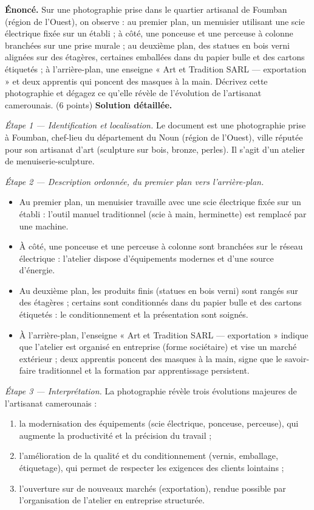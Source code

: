 \documentclass[11pt]{article}
\newcommand{\cle}[1]{{\popxbold\color{popdark}#1}}
\begin{document}
\begin{exoresolu}
\textbf{Énoncé.} Sur une photographie prise dans le quartier artisanal de Foumban (région de l'Ouest), on observe : au premier plan, un menuisier utilisant une scie électrique fixée sur un établi ; à côté, une ponceuse et une perceuse à colonne branchées sur une prise murale ; au deuxième plan, des statues en bois verni alignées sur des étagères, certaines emballées dans du papier bulle et des cartons étiquetés ; à l'arrière-plan, une enseigne « Art et Tradition SARL — exportation » et deux apprentis qui poncent des masques à la main.
Décrivez cette photographie et dégagez ce qu'elle révèle de l'évolution de l'artisanat camerounais. (6 points)
\tcblower
\textbf{Solution détaillée.}

\emph{Étape 1 — Identification et localisation.} Le document est une photographie prise à Foumban, chef-lieu du département du Noun (région de l'Ouest), ville réputée pour son artisanat d'art (sculpture sur bois, bronze, perles). Il s'agit d'un atelier de menuiserie-sculpture.

\emph{Étape 2 — Description ordonnée, du premier plan vers l'arrière-plan.}
\begin{itemize}
\item Au premier plan, un menuisier travaille avec une \cle{scie électrique} fixée sur un établi : l'outil manuel traditionnel (scie à main, herminette) est remplacé par une machine.
\item À côté, une \cle{ponceuse} et une \cle{perceuse} à colonne sont branchées sur le réseau électrique : l'atelier dispose d'équipements modernes et d'une source d'énergie.
\item Au deuxième plan, les produits finis (statues en bois verni) sont rangés sur des étagères ; certains sont \cle{conditionnés} dans du papier bulle et des cartons étiquetés : le conditionnement et la présentation sont soignés.
\item À l'arrière-plan, l'enseigne « Art et Tradition SARL — exportation » indique que l'atelier est organisé en entreprise (forme sociétaire) et vise un marché extérieur ; deux apprentis poncent des masques à la main, signe que le savoir-faire traditionnel et la formation par apprentissage persistent.
\end{itemize}

\emph{Étape 3 — Interprétation.} La photographie révèle trois évolutions majeures de l'artisanat camerounais :
\begin{enumerate}
\item la \cle{modernisation des équipements} (scie électrique, ponceuse, perceuse), qui augmente la productivité et la précision du travail ;
\item l'\cle{amélioration de la qualité et du conditionnement} (vernis, emballage, étiquetage), qui permet de respecter les exigences des clients lointains ;
\item l'\cle{ouverture sur de nouveaux marchés} (exportation), rendue possible par l'organisation de l'atelier en entreprise structurée.
\end{enumerate}


\end{exoresolu}
\end{document}
